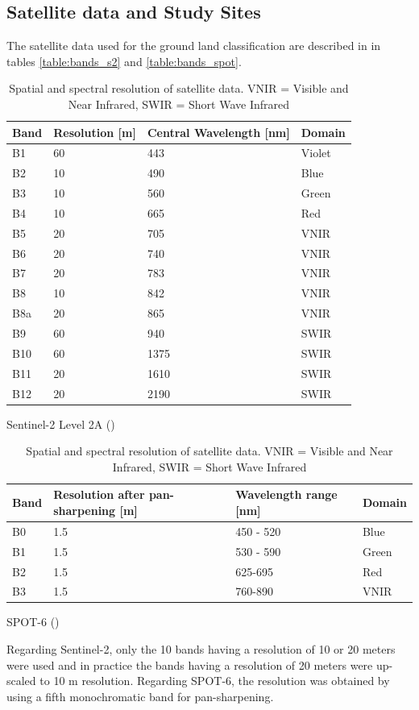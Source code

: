 \documentclass[10pt]{article}
\begin{document}
\subsection{Satellite data and Study Sites}
The satellite data used for the ground land classification are described in in tables \ref{table:bands_s2} and \ref{table:bands_spot}.
\begin{table}[H]
    \centering
    \begin{subtable}{.52\textwidth}
        \centering
        \begin{tabular}{@{}lp{2cm}p{2.2cm}l@{}}\toprule
            Band & Resolution [m] & Central Wavelength [nm] & Domain \\\hline
            B1 & 60 & 443 & Violet \\
            B2 & 10 & 490 & Blue \\
            B3 & 10 & 560 & Green \\
            B4 & 10 & 665 & Red \\
            B5 & 20 & 705 & VNIR \\
            B6 & 20 & 740 & VNIR \\
            B7 & 20 & 783 & VNIR \\
            B8 & 10 & 842 & VNIR \\
            B8a & 20 & 865 & VNIR \\
            B9 & 60 & 940 & SWIR \\
            B10 & 60 & 1375 & SWIR \\
            B11 & 20 & 1610 & SWIR \\
            B12 & 20 & 2190 & SWIR\\\bottomrule
        \end{tabular}
        \caption{Sentinel-2 Level 2A (\cite{esa-s2res,theia})}
        \label{table:bands_s2}
    \end{subtable}
    \begin{subtable}{.45\textwidth}
        \centering
        \begin{tabular}{@{}lp{1.8cm}p{2cm}l@{}}\toprule
            Band & Resolution after pan-sharpening [m] & Wavelength range [nm] & Domain \\\hline
            B0 & 1.5 & 450 - 520 & Blue \\
            B1 & 1.5 & 530 - 590 & Green \\
            B2 & 1.5 & 625-695 & Red \\
            B3 & 1.5 & 760-890 & VNIR \\\bottomrule
        \end{tabular}
        \caption{SPOT-6 (\cite{SPOT6_technical-sheet})}
        \label{table:bands_spot}
    \end{subtable}
    \caption{Spatial and spectral resolution of satellite data. VNIR = Visible and Near Infrared, SWIR = Short Wave Infrared}
    \label{table:bands}
\end{table}
Regarding Sentinel-2, only the 10 bands having a resolution of 10 or 20 meters were used and in practice the bands having a resolution of 20 meters were up-scaled to 10 m resolution. Regarding SPOT-6, the resolution was obtained by using a fifth monochromatic band for pan-sharpening. \\
\end{document}
